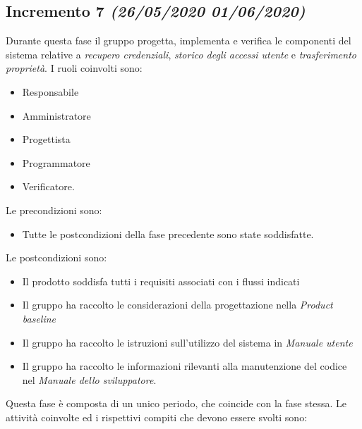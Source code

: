 \documentclass[../piano-di-progetto.tex]{subfiles}
\begin{document}
\subsection[Incremento 7]{Incremento 7 {\normalsize\normalfont\itshape(26/05/2020  01/06/2020)}}%
\label{sub:incremento_7}
Durante questa fase il gruppo progetta, implementa e verifica le componenti del sistema relative a \textit{recupero credenziali}, \textit{storico degli accessi utente} e \textit{trasferimento proprietà}.
I ruoli coinvolti sono:
\begin{itemize}
  \item Responsabile
  \item Amministratore
  \item Progettista
  \item Programmatore
  \item Verificatore.
\end{itemize}
Le precondizioni sono:
\begin{itemize}
  \item Tutte le postcondizioni della fase precedente sono state soddisfatte.
\end{itemize}
Le postcondizioni sono:
\begin{itemize}
  \item Il prodotto soddisfa tutti i requisiti associati con i flussi indicati
  \item Il gruppo ha raccolto le considerazioni della progettazione nella \textit{Product baseline}
  \item Il gruppo ha raccolto le istruzioni sull'utilizzo del sistema in \textit{Manuale utente}
  \item Il gruppo ha raccolto le informazioni rilevanti alla manutenzione del codice nel \textit{Manuale dello sviluppatore}.
\end{itemize}
Questa fase è composta di un unico periodo, che coincide con la fase stessa.
Le attività coinvolte ed i rispettivi compiti che devono essere svolti sono:
\end{document}
